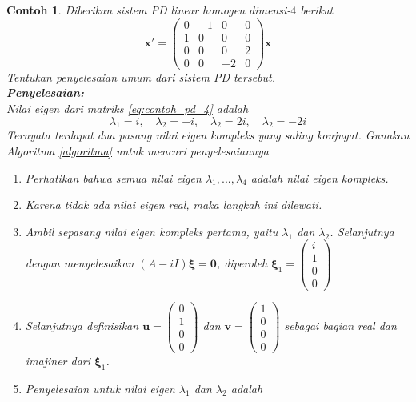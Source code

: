 \documentclass[a4paper]{article}
\theoremstyle{definisi}
\newtheorem{contoh}{Contoh}[section]
\newcommand{\bfxi}{\boldsymbol{\xi}}
\newcommand{\penyelesaian}{\textbf{\underline{Penyelesaian:}}\\}
\numberwithin{equation}{section}
\begin{document}
  \begin{contoh}
    Diberikan sistem PD linear homogen dimensi-$4$ berikut
    \begin{equation}\label{eq:contoh_pd_4}
      \mathbf{x'}=\begin{pmatrix}
        0 & -1 & 0 & 0\\
        1 & 0 & 0 & 0\\
        0 & 0 & 0 & 2\\
        0 & 0 & -2 & 0 
      \end{pmatrix}\mathbf{x}
    \end{equation}
    Tentukan penyelesaian umum dari sistem PD tersebut.\\
    \penyelesaian
    Nilai eigen dari matriks \eqref{eq:contoh_pd_4} adalah
    \[\lambda_1 = i, \quad \lambda_2 = -i,\quad \lambda_2 = 2i, \quad \lambda_2 = -2i\]
    Ternyata terdapat dua pasang nilai eigen kompleks yang saling konjugat. Gunakan Algoritma \ref{algoritma} untuk mencari penyelesaiannya
    \begin{enumerate}[label=Langkah \arabic*: ,leftmargin=*]
      \item Perhatikan bahwa semua nilai eigen $\lambda_1,...,\lambda_4$ adalah nilai eigen kompleks.
      \item Karena tidak ada nilai eigen real, maka langkah ini dilewati.
      \item Ambil sepasang nilai eigen kompleks pertama, yaitu $\lambda_1$ dan $\lambda_2$. Selanjutnya dengan menyelesaikan $(A-iI)\bfxi = \mathbf{0}$, diperoleh
      $\bfxi_1 = \begin{pmatrix}i\\1\\0\\0\end{pmatrix}$
      \item Selanjutnya definisikan $\mathbf{u} = \begin{pmatrix}0\\1\\0\\0\end{pmatrix}$ dan $\mathbf{v} = \begin{pmatrix}1\\0\\0\\0\end{pmatrix}$ sebagai bagian real dan imajiner dari $\bfxi_1$.
      \item Penyelesaian untuk nilai eigen $\lambda_1$ dan $\lambda_2$ adalah
      \begin{equation}\label{eq:contoh_pd_4_penyelesaian_1}

\end{equation}
\end{enumerate}
\end{contoh}
\end{document}
